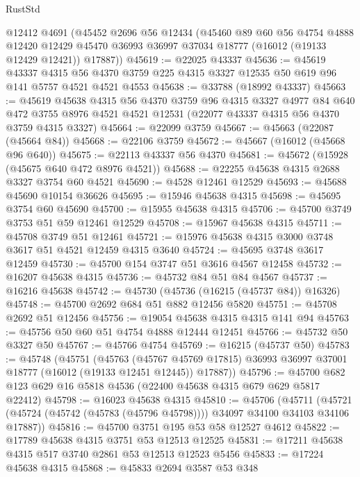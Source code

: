 \begin{lexlean}{RustStd}
\begin{coremodule}
    @12412
    @4691
    (@45452
      @2696
      @56
      @12434
      (@45460
        @89
        @60
        @56
        @4754
        @4888
        @12420
        @12429
        @45470
        @36993
        @36997
        @37034
        @18777
        (@16012 (@19133 @12429 @12421))
        @17887))
@45619 := @22025 @43337
@45636 := @45619
    @43337
    @4315
    @56
    @4370
    @3759
    @225
    @4315
    @3327
    @12535
    @50
    @619
    @96
    @141
    @5757
    @4521
    @4521
    @4553
@45638 := @33788 (@18992 @43337)
@45663 := @45619
    @45638
    @4315
    @56
    @4370
    @3759
    @96
    @4315
    @3327
    @4977
    @84
    @640
    @472
    @3755
    @8976
    @4521
    @4521
    @12531
    (@22077 @43337 @4315 @56 @4370 @3759 @4315 @3327)
@45664 := @22099 @3759
@45667 := @45663 (@22087 (@45664 @84))
@45668 := @22106 @3759
@45672 := @45667 (@16012 (@45668 @96 @640))
@45675 := @22113 @43337 @56 @4370
@45681 := @45672 (@15928 (@45675 @640 @472 @8976 @4521))
@45688 := @22255 @45638 @4315 @2688 @3327 @3754 @60 @4521
@45690 := @4528 @12461 @12529
@45693 := @45688 @45690 @10154 @36626
@45695 := @15946 @45638 @4315
@45698 := @45695 @3754 @60 @45690
@45700 := @15955 @45638 @4315
@45706 := @45700 @3749 @3753 @51 @59 @12461 @12529
@45708 := @15967 @45638 @4315
@45711 := @45708 @3749 @51 @12461
@45721 := @15976 @45638 @4315 @3000 @3748 @3617 @51 @4521 @12459 @4315 @3640
@45724 := @45695 @3748 @3617 @12459
@45730 := @45700 @154 @3747 @51 @3616 @4567 @12458
@45732 := @16207 @45638 @4315
@45736 := @45732 @84 @51 @84 @4567
@45737 := @16216 @45638
@45742 := @45730 (@45736 (@16215 (@45737 @84)) @16326)
@45748 := @45700 @2692 @684 @51 @882 @12456 @5820
@45751 := @45708 @2692 @51 @12456
@45756 := @19054 @45638 @4315 @4315 @141 @94
@45763 := @45756 @50 @60 @51 @4754 @4888 @12444 @12451
@45766 := @45732 @50 @3327 @50
@45767 := @45766 @4754
@45769 := @16215 (@45737 @50)
@45783 := @45748
    (@45751
      (@45763
        (@45767 @45769 @17815)
        @36993
        @36997
        @37001
        @18777
        (@16012 (@19133 @12451 @12445))
        @17887))
@45796 := @45700 @682 @123 @629 @16 @5818 @4536 (@22400 @45638 @4315 @679 @629 @5817 @22412)
@45798 := @16023 @45638 @4315
@45810 := @45706
    (@45711 (@45721 (@45724 (@45742 (@45783 (@45796 @45798)))) @34097 @34100 @34103 @34106 @17887))
@45816 := @45700 @3751 @195 @53 @58 @12527 @4612
@45822 := @17789 @45638 @4315 @3751 @53 @12513 @12525
@45831 := @17211 @45638 @4315 @517 @3740 @2861 @53 @12513 @12523 @5456
@45833 := @17224 @45638 @4315
@45868 := @45833
    @2694
    @3587
    @53
    @348

\end{coremodule}
\end{lexlean}
